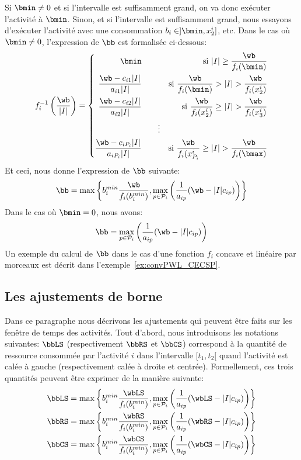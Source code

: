 Si $\bmin\neq 0$ et si l'intervalle est suffisamment grand, on va donc
exécuter l'activité à $\bmin$. Sinon, et si l'intervalle est
suffisamment grand, nous essayons d'exécuter l'activité avec une
consommation $b_i \in ]\bmin,x_2^i]$, etc. Dans le cas où $\bmin \neq
0$, l'expression de $\bb$ est formalisée ci-dessous:
\[f_i^{-1}\left(\frac{\wb}{|I|}\right)=\left\{
\begin{aligned}
\bmin & \qquad & \text{si } |I| \ge \frac{\wb}{f_i(\bmin)}\\
\frac{\wb -c_{i1}|I|}{a_{i1}|I|} & \qquad & \text{si } \frac{\wb}{f_i(\bmin)}
> |I| > \frac{\wb}{f_i(x^i_2)} \\
\frac{\wb -c_{i2}|I|}{a_{i2}|I|} & \qquad & \text{si }  \frac{\wb}{f_i(x^i_2)}
\ge |I| > \frac{\wb}{f_i(x^i_3)}\\
 & \qquad \vdots& \\
\frac{\wb -c_{iP_i}|I|}{a_{iP_i}|I|} & \qquad & \text{si }  \frac{\wb}{f_i(x^i_{P_i}}
\ge |I| > \frac{\wb}{f_i(\bmax)}\end{aligned}
\right.
\]
Et ceci, nous donne l'expression de $\bb$ suivante:
\begin{equation}
\bb= 
  \max \left\{b_i^{min} \frac{\wb}{f_i(b_i^{min})},
  \max_{ p \in \P_i} \left(\frac{1}{a_{ip}}(\wb-|I|c_{ip})\right)\right\}
\end{equation}
Dans le cas où $\bmin=0$, nous avons: 
\[
\bb= 
  \max_{ p \in \P_i} \left(\frac{1}{a_{ip}}(\wb-|I|c_{ip})\right)
\]
Un exemple du calcul de $\bb$ dans le cas d'une fonction $f_i$ concave
et linéaire par morceaux est décrit dans
l'exemple~\ref{ex:convPWL_CECSP}.

\begin{ex}
\label{ex:convPWL_CECSP}

\end{ex}

\subsection{Les ajustements de borne}
\label{sec:adjustment_tw}
 
Dans ce paragraphe nous décrivons les ajustements qui peuvent être
faits sur les fenêtre de temps des activités. Tout d'abord, nous
introduisons les notations suivantes: $\bbLS$ (respectivement $\bbRS$
et $\bbCS$) correspond à la quantité de ressource consommée par
l'activité $i$ dans l'intervalle $[t_1,t_2[$ quand l'activité est
calée à gauche (respectivement calée à droite et
centrée). Formellement, ces trois quantités peuvent être exprimer de
la manière suivante:
\begin{align}
\bbLS&=   \max \left\{b_i^{min} \frac{\wbLS}{f_i(b_i^{min})},
  \max_{ p \in \P_i} \left(\frac{1}{a_{ip}}(\wbLS-|I|c_{ip})\right)\right\}\\
\bbRS&=   \max \left\{b_i^{min} \frac{\wbRS}{f_i(b_i^{min})},
  \max_{ p \in \P_i} \left(\frac{1}{a_{ip}}(\wbRS-|I|c_{ip})\right)\right\}\\
\bbCS&=  \max \left\{b_i^{min} \frac{\wbCS}{f_i(b_i^{min})},
  \max_{ p \in \P_i} \left(\frac{1}{a_{ip}}(\wbCS-|I|c_{ip})\right)\right\}
\end{align}

